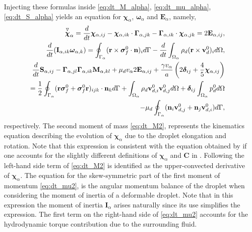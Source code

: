 Injecting these formulas inside \ref{eq:dt_M_alpha}, \ref{eq:dt_mu_alpha}, \ref{eq:dt_S_alpha} yields an equation for $\bm\chi_\alpha$, $\bm\omega_\alpha$ and $\textbf{E}_\alpha$, namely,
\begin{align}
    \overset{ \triangledown  }{\bm\chi}_\alpha
    = 
    \ddt \bm\chi_{\alpha,ij}
    -\bm\chi_{\alpha,ik} \cdot \bm\Gamma_{\alpha,jk}
    - \bm\Gamma_{\alpha,ik} \cdot \bm\chi_{\alpha,jk}
    =
    2\textbf{E}_{\alpha,ij},
    \label{eq:dt_M2}
    \\
    \ddt (\textbf{I}_{\alpha,ik}\bm\omega_{\alpha,k} )
    = 
    \intS{(\textbf{r}\times\bm\sigma_f^0\cdot \textbf{n})_i}
    - \ddt\intO{\rho_d(\textbf{r}\times \textbf{v}_d^0)_i},
    \label{eq:dt_mu2}
    \\
    \ddt \textbf{S}_{\alpha,ij}
    -  \bm\Gamma_{\alpha,jl}\bm\Gamma_{\alpha,ik} \textbf{M}_{\alpha,kl}  
    + \mu_d v_\alpha 2\textbf{E}_{\alpha,ij}
    + \frac{\gamma v_\alpha }{a} \left(
    2\bm\delta_{ij} 
    + \frac{4 }{5} \bm\chi_{\alpha,ij}
    \right) \nonumber\\
    = 
    \frac{1}{2}\intS{(\textbf{r}\bm\sigma_f^0 + \bm\sigma_f^0\textbf{r})_{ijk}\cdot \textbf{n}_k} 
    + \intO{\rho_d \textbf{v}_{d,i}^0\textbf{v}_{d,j}^0}
    + \bm\delta_{ij}\intO{p_d^0} \nonumber\\
    - \mu_d \intS{(\textbf{n}_i \textbf{v}_{d,j}^0 + \textbf{n}_j \textbf{v}_{d,i}^0)},
    \label{eq:dt_S2}
\end{align}
respectively. 
The second moment of mass \ref{eq:dt_M2}, represents the kinematics   equation describing the evolution of $\bm\chi_\alpha$ due to the droplet elongation and rotation. 
Note that this expression is consistent with the equation obtained by \citet{goddard1967nonlinear} if one accounts for the slightly different definitions of $\bm\chi_\alpha$ and \textbf{C} in \citet{goddard1967nonlinear}.
Following \citet{goddard1967nonlinear} the left-hand side term of \ref{eq:dt_M2} is identified as the upper-convected derivative of $\bm\chi_\alpha$. 
The equation for the skew-symmetric part of the first moment of momentum \ref{eq:dt_mu2}, is the angular momentum balance of the droplet when considering the moment of inertia of a deformable droplet.
Note that in this expression the moment of inertia $\textbf{I}_\alpha$ arises naturally since its use simplifies the expression. 
The first term on the right-hand side of \ref{eq:dt_mu2} accounts for the hydrodynamic torque contribution due to the surrounding fluid.
